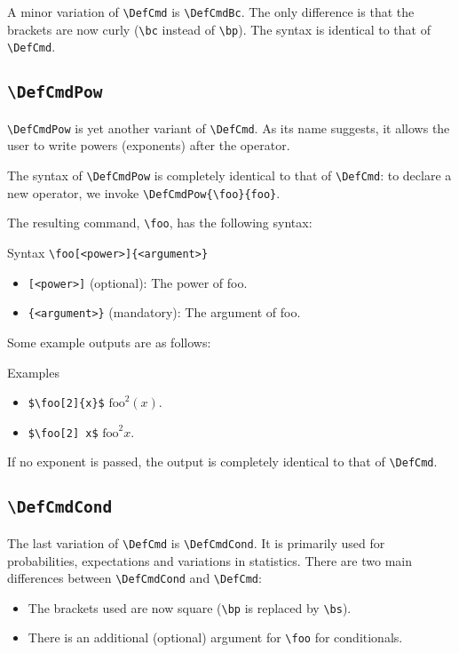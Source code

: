 A minor variation of \verb|\DefCmd| is \verb|\DefCmdBc|. The only difference is that the brackets are now curly (\verb|\bc| instead of \verb|\bp|). The syntax is identical to that of \verb|\DefCmd|.

\subsection{\texttt{\textbackslash DefCmdPow}}

\verb|\DefCmdPow| is yet another variant of \verb|\DefCmd|. As its name suggests, it allows the user to write powers (exponents) after the operator. 

The syntax of \verb|\DefCmdPow| is completely identical to that of \verb|\DefCmd|: to declare a new operator, we invoke \verb|\DefCmdPow{\foo}{foo}|.

The resulting command, \verb|\foo|, has the following syntax:

\begin{myframe}{Syntax }
    \verb|\foo[<power>]{<argument>}|
    \begin{itemize}
        \item \verb|[<power>]| (optional): The power of foo.
        \item \verb|{<argument>}| (mandatory): The argument of foo.
    \end{itemize}
\end{myframe}

Some example outputs are as follows:

\begin{myframe}{Examples }
    \begin{itemize}
        \item \verb|$\foo[2]{x}$| \produces{} $\mathrm{foo}^2(x)$.
        \item \verb|$\foo[2] x$| \produces{} $\mathrm{foo}^2 x$.
    \end{itemize}
\end{myframe}

If no exponent is passed, the output is completely identical to that of \verb|\DefCmd|.

\subsection{\texttt{\textbackslash DefCmdCond}}

The last variation of \verb|\DefCmd| is \verb|\DefCmdCond|. It is primarily used for probabilities, expectations and variations in statistics. There are two main differences between \verb|\DefCmdCond| and \verb|\DefCmd|:
\begin{itemize}
    \item The brackets used are now square (\verb|\bp| is replaced by \verb|\bs|).
    \item There is an additional (optional) argument for \verb|\foo| for conditionals.
\end{itemize}

